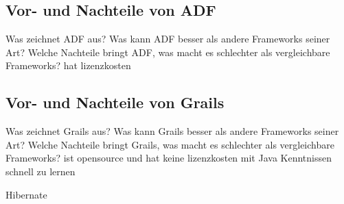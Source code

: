 \subsection{Vor- und Nachteile von ADF}
Was zeichnet ADF aus? Was kann ADF besser als andere Frameworks seiner Art?
Welche Nachteile bringt ADF, was macht es schlechter als vergleichbare Frameworks?
hat lizenzkosten
\subsection{Vor- und Nachteile von Grails}
Was zeichnet Grails aus? Was kann Grails besser als andere Frameworks seiner Art?
Welche Nachteile bringt Grails, was macht es schlechter als vergleichbare Frameworks?
ist opensource und hat keine lizenzkosten
mit Java Kenntnissen schnell zu lernen

Hibernate

